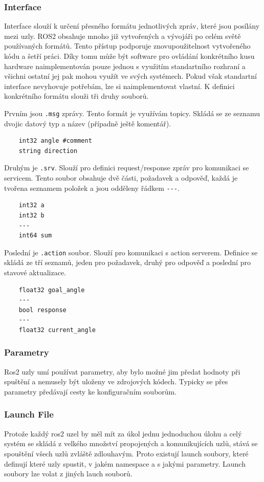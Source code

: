 \subsubsection*{Interface}
Interface slouží k určení přesného formátu jednotlivých zpráv, které jsou posílány mezi uzly. ROS2 obsahuje mnoho již vytvořených a vývojáři po celém světě používaných formátů. Tento přístup podporuje znovupoužitelnost vytvořeného kódu a šetří práci. Díky tomu může být software pro ovládání konkrétního kusu hardware naimplementován pouze jednou s využitím standartního rozhraní a všichni ostatní jej pak mohou využít ve svých systémech.
Pokud však standartní interface nevyhovuje potřebám, lze si naimplementovat vlastní. K definici konkrétního formátu slouži tři druhy souborů. 

Prvním jsou \verb|.msg| zprávy. Tento formát je využívám topicy. Skládá se ze seznamu dvojic datový typ a název (případně ještě komentář).
\begin{verbatim}
	int32 angle #comment
	string direction
\end{verbatim}

Druhým je \verb|.srv|. Slouží pro definici request/response zpráv pro komunikaci se servicem. Tento soubor obsahuje dvě části, požadavek a odpověď, každá je tvořena seznamem položek a jsou odděleny řádkem \verb|---|. 
\begin{verbatim}
	int32 a
	int32 b
	---
	int64 sum
\end{verbatim}

Poslední je \verb|.action| soubor. Slouží pro komunikaci s action serverem. Definice se skládá ze tří seznamů, jeden pro požadavek, druhý pro odpověď a poslední pro stavové aktualizace.
\begin{verbatim}
	float32 goal_angle
	---
	bool response
	---
	float32 current_angle
\end{verbatim}


\subsubsection*{Parametry} %
Ros2 uzly umí používat parametry, aby bylo možné jim předat hodnoty při spuštění a nemusely být uloženy ve zdrojových kódech. Typicky se přes parametry předávají cesty ke konfiguračním souborům. 

\subsubsection*{Launch File} %
Protože každý ros2 uzel by měl mít za úkol jednu jednoduchou úlohu a celý systém se skládá z velkého množství propojených a komunikujících uzlů, stává se spouštění všech uzlů zvláště zdlouhavým. Proto existují launch soubory, které definují které uzly spustit, v jakém namespace a s jakými parametry. Launch soubory lze volat z jiných lauch souborů. %

